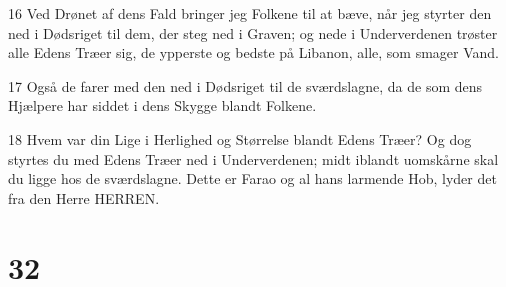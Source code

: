 \par 16 Ved Drønet af dens Fald bringer jeg Folkene til at bæve, når jeg styrter den ned i Dødsriget til dem, der steg ned i Graven; og nede i Underverdenen trøster alle Edens Træer sig, de ypperste og bedste på Libanon, alle, som smager Vand.
\par 17 Også de farer med den ned i Dødsriget til de sværdslagne, da de som dens Hjælpere har siddet i dens Skygge blandt Folkene.
\par 18 Hvem var din Lige i Herlighed og Størrelse blandt Edens Træer? Og dog styrtes du med Edens Træer ned i Underverdenen; midt iblandt uomskårne skal du ligge hos de sværdslagne. Dette er Farao og al hans larmende Hob, lyder det fra den Herre HERREN.

\chapter{32}

